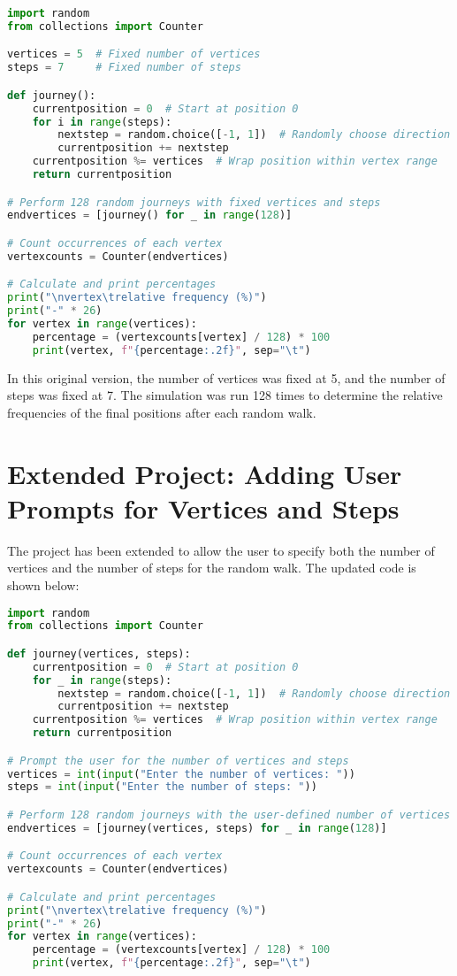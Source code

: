 \documentclass[a4paper,12pt]{amsart}
\begin{document}
\begin{lstlisting}[language=Python]
import random
from collections import Counter

vertices = 5  # Fixed number of vertices
steps = 7     # Fixed number of steps

def journey(): 
    currentposition = 0  # Start at position 0
    for i in range(steps):
        nextstep = random.choice([-1, 1])  # Randomly choose direction
        currentposition += nextstep
    currentposition %= vertices  # Wrap position within vertex range
    return currentposition

# Perform 128 random journeys with fixed vertices and steps
endvertices = [journey() for _ in range(128)]

# Count occurrences of each vertex
vertexcounts = Counter(endvertices)

# Calculate and print percentages
print("\nvertex\trelative frequency (%)")
print("-" * 26)
for vertex in range(vertices):
    percentage = (vertexcounts[vertex] / 128) * 100
    print(vertex, f"{percentage:.2f}", sep="\t")
\end{lstlisting}

In this original version, the number of vertices was fixed at 5, and the number of steps was fixed at 7. The simulation was run 128 times to determine the relative frequencies of the final positions after each random walk. 

\section{Extended Project: Adding User Prompts for Vertices and Steps}
The project has been extended to allow the user to specify both the number of vertices and the number of steps for the random walk. The updated code is shown below:

\begin{lstlisting}[language=Python]
import random
from collections import Counter

def journey(vertices, steps):
    currentposition = 0  # Start at position 0
    for _ in range(steps):
        nextstep = random.choice([-1, 1])  # Randomly choose direction
        currentposition += nextstep
    currentposition %= vertices  # Wrap position within vertex range
    return currentposition

# Prompt the user for the number of vertices and steps
vertices = int(input("Enter the number of vertices: "))
steps = int(input("Enter the number of steps: "))

# Perform 128 random journeys with the user-defined number of vertices and steps
endvertices = [journey(vertices, steps) for _ in range(128)]

# Count occurrences of each vertex
vertexcounts = Counter(endvertices)

# Calculate and print percentages
print("\nvertex\trelative frequency (%)")
print("-" * 26)
for vertex in range(vertices):
    percentage = (vertexcounts[vertex] / 128) * 100
    print(vertex, f"{percentage:.2f}", sep="\t")
\end{lstlisting}
\end{document}
